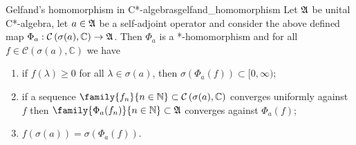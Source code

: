 \begin{theorem}{Gelfand's homomorphism in C*-algebras}{gelfand_homomorphism}
    Let \(\mathfrak{A}\) be unital C*-algebra, let \(a \in \mathfrak{A}\) be a self-adjoint operator and consider the above defined map \(\Phi_a : \mathcal{C}\left(\sigma(a), \mathbb{C}\right) \to \mathfrak{A}\). Then \(\Phi_a\) is a *-homomorphism and for all \(f \in \mathcal{C}\left(\sigma(a), \mathbb{C}\right)\) we have
    \begin{enumerate}[label=(\alph*)]
        \item if \(f(\lambda) \geq 0\) for all \(\lambda \in \sigma(a)\), then \(\sigma(\Phi_a(f)) \subset [0, \infty)\);
        \item if a sequence \(\family{f_n}{n\in \mathbb{N}}\subset \mathcal{C}\left(\sigma(a), \mathbb{C}\right)\) converges uniformly against \(f\) then \(\family{\Phi_a(f_n)}{n\in \mathbb{N}} \subset \algebra{A}\) converges against \(\Phi_a(f)\);
        \item \(f(\sigma(a)) = \sigma(\Phi_a(f))\).
    \end{enumerate}
\end{theorem}

